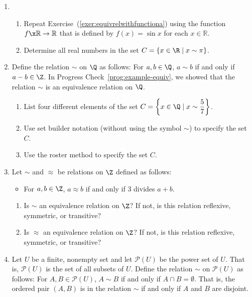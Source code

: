 \begin{enumerate}
\item \begin{enumerate}
\item Repeat Exercise~(\ref{exer:equivrelwithfunctiona}) using the function 
$f\x \mathbb{R} \to \mathbb{R}$ that is defined by  $f( x ) = \sin x$ for each  
$x \in \mathbb{R}$.

\item Determine all real numbers in the set $C = \left\{ { {x \in \R } \mid x \sim \pi } \right\}$.
\end{enumerate}

\item Define the relation $\sim$ on $\Q$ as follows:  For $a, b \in \Q$, $a \sim b$ if and only if $a - b \in \Z$. \label{exer:sec72-diffQ}  In Progress Check~\ref{prog:example-equiv}, we showed that the relation $\sim$ is an equivalence relation on $\Q$.

\begin{enumerate}
  \item List  four  different elements of the set  
        $C = \left\{ { {x \in \Q } \mid x \sim \dfrac{5}{7} } \right\}$.

  \item Use set builder notation (without using the symbol $\sim$) to specify the set $C$.

  \item Use the roster method to specify the set $C$.
\end{enumerate}

\item \label{exer:oneequivonenot} Let $\sim$ and $\approx$ be relations on $\Z$ defined as follows:

\begin{itemize}
\yitem For $a, b \in \Z$, $a \sim b$ if and only if 2 divides $a + b$.
\item For $a, b \in \Z$, $a \approx b$ if and only if 3 divides $a + b$.
\end{itemize}

\begin{enumerate}
\item Is $\sim$ an equivalence relation on $\Z$?  If not, is this relation reflexive, symmetric, or transitive?
\item Is $\approx$ an equivalence relation on $\Z$?  If not, is this relation reflexive, symmetric, or transitive?
\end{enumerate}


\item Let  $U$  be a finite, nonempty set and let  $\mathcal{P}( U )$ be the power set of  $U$.  That is, $\mathcal{P} ( U )$ is the set of all subsets of $U$.  Define the relation  $\sim$  on $\mathcal{P}( U )$  as follows:  For  $A, B \in \mathcal{P}( U )$,
 $A \sim B$  if and only if  $A \cap B = \emptyset $.	That is,  the ordered pair  
$\left( {A, B} \right)$  is in the relation  $\sim$  if and only if  $A$  and  $B$  are disjoint.


\end{enumerate}
